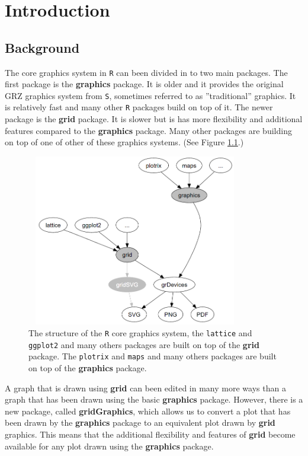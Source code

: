 \documentclass[11pt,twoside]{report}
\begin{document}
\chapter{Introduction}
\section{Background}
The core graphics system in \texttt{R} \citep{R2017} can been divided in to two main packages. The first package is the \textbf{graphics} package. It is older and it provides the original GRZ graphics system from \texttt{S}, sometimes referred to as ''traditional'' graphics. It is relatively fast and many other \texttt{R} packages build on top of it. The newer package is the \textbf{grid} package. It is slower but is has more flexibility and additional features compared to the \textbf{graphics} package. Many other packages are building on top of one of other of these graphics systems. (See Figure \ref{intro}.) \\

\begin{figure}[h]
	\begin{center}
		\includegraphics[height = 7.5cm, width = 9.5cm]{figure/intro.png}
		\caption{The structure of the \texttt{R} core graphics system, the \texttt{lattice} \citep{lattice}  and \texttt{ggplot2} \citep{ggplot2} and many others packages are built on top of the \textbf{grid} package. The \texttt{plotrix} \citep{plotrix} and \texttt{maps} \citep{maps} and many others packages are built on top of the \textbf{graphics} package. }
		\label{intro}
	\end{center}
\end{figure}

A graph that is drawn using \textbf{grid} can been edited in many more ways than a graph that has been drawn using the basic \textbf{graphics} package. However, there is a new package, called \textbf{gridGraphics}, which allows us to convert a plot that has been drawn by the \textbf{graphics} package to an equivalent plot drawn by \textbf{grid} graphics. This means that the additional flexibility and features of \textbf{grid} become available for any plot drawn using the \textbf{graphics} package. \\
\end{document}
